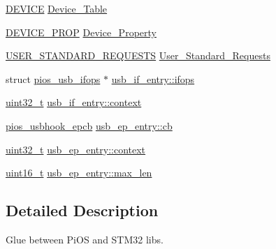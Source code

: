 \begin{DoxyCompactItemize}
\item 
\hyperlink{_s_t_m32_f10x_2_libraries_2_s_t_m32___u_s_b-_f_s-_device___driver_2inc_2usb__core_8h_a85594805bde95346bc3a19853317a89d}{D\-E\-V\-I\-C\-E} \hyperlink{group___p_i_o_s___u_s_b_h_o_o_k_gafa47e7c7d5d6fb4c682e16c89c1b7d75}{Device\-\_\-\-Table}
\item 
\hyperlink{_s_t_m32_f10x_2_libraries_2_s_t_m32___u_s_b-_f_s-_device___driver_2inc_2usb__core_8h_a90353becd4185446508b796a7f39fbce}{D\-E\-V\-I\-C\-E\-\_\-\-P\-R\-O\-P} \hyperlink{group___p_i_o_s___u_s_b_h_o_o_k_ga646bdfc60e69ee637f2c39b5bb91dfec}{Device\-\_\-\-Property}
\item 
\hyperlink{_s_t_m32_f10x_2_libraries_2_s_t_m32___u_s_b-_f_s-_device___driver_2inc_2usb__core_8h_abf9887b82ae511cfb155d0d97c9a7c1a}{U\-S\-E\-R\-\_\-\-S\-T\-A\-N\-D\-A\-R\-D\-\_\-\-R\-E\-Q\-U\-E\-S\-T\-S} \hyperlink{group___p_i_o_s___u_s_b_h_o_o_k_ga8d70d0a7e05cf9c172e4304def6b65b8}{User\-\_\-\-Standard\-\_\-\-Requests}
\item 
struct \hyperlink{structpios__usb__ifops}{pios\-\_\-usb\-\_\-ifops} $\ast$ \hyperlink{group___p_i_o_s___u_s_b_h_o_o_k_ga8c6a8d1a868734fd250c8af665a54c3c}{usb\-\_\-if\-\_\-entry\-::ifops}
\item 
\hyperlink{stdint_8h_a435d1572bf3f880d55459d9805097f62}{uint32\-\_\-t} \hyperlink{group___p_i_o_s___u_s_b_h_o_o_k_gad9a6d740530f937ee0fd2870b5c02ce8}{usb\-\_\-if\-\_\-entry\-::context}
\item 
\hyperlink{group___p_i_o_s___u_s_b_h_o_o_k_ga5f7904cd3922ab7207afebe3d9ef2650}{pios\-\_\-usbhook\-\_\-epcb} \hyperlink{group___p_i_o_s___u_s_b_h_o_o_k_gaf0106468de445de05247315a6001789c}{usb\-\_\-ep\-\_\-entry\-::cb}
\item 
\hyperlink{stdint_8h_a435d1572bf3f880d55459d9805097f62}{uint32\-\_\-t} \hyperlink{group___p_i_o_s___u_s_b_h_o_o_k_ga044e4671681d96fdf1918abb9e52542e}{usb\-\_\-ep\-\_\-entry\-::context}
\item 
\hyperlink{stdint_8h_a273cf69d639a59973b6019625df33e30}{uint16\-\_\-t} \hyperlink{group___p_i_o_s___u_s_b_h_o_o_k_ga010957cf5bf2628ba64249b8c1271f91}{usb\-\_\-ep\-\_\-entry\-::max\-\_\-len}
\end{DoxyCompactItemize}


\subsection{Detailed Description}
Glue between Pi\-O\-S and S\-T\-M32 libs. 

